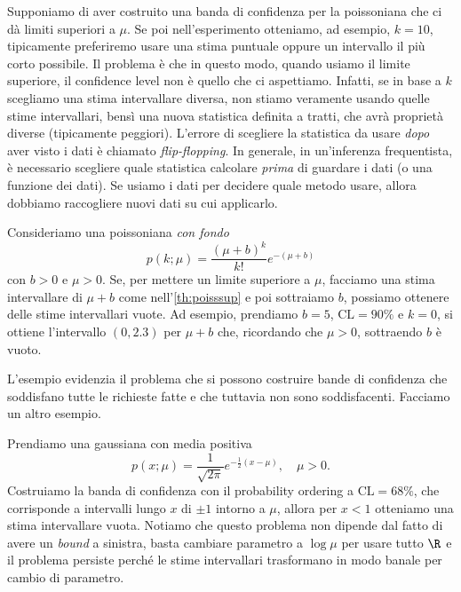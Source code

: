 
Supponiamo di aver costruito una banda di confidenza per la poissoniana che ci dà limiti superiori a $\mu$.
Se poi nell'esperimento otteniamo, ad esempio, $k=10$,
tipicamente preferiremo usare una stima puntuale oppure un intervallo il più corto possibile.
Il problema è che in questo modo, quando usiamo il limite superiore,
il confidence level non è quello che ci aspettiamo.
Infatti, se in base a $k$ scegliamo una stima intervallare diversa,
non stiamo veramente usando quelle stime intervallari,
bensì una nuova statistica definita a tratti,
che avrà proprietà diverse (tipicamente peggiori).
L'errore di scegliere la statistica da usare \emph{dopo}
aver visto i dati è chiamato \emph{flip-flopping}.
In generale, in un'inferenza frequentista,
è necessario scegliere quale statistica calcolare \emph{prima}
di guardare i dati (o una funzione dei dati).
Se usiamo i dati per decidere quale metodo usare,
allora dobbiamo raccogliere nuovi dati su cui applicarlo.

\begin{example}
	Consideriamo una poissoniana \emph{con fondo}
	\begin{equation*}
		p(k;\mu)
		= \frac{(\mu+b)^k}{k!}e^{-(\mu+b)}
	\end{equation*}
	con $b>0$ e $\mu>0$.
	Se, per mettere un limite superiore a $\mu$,
	facciamo una stima intervallare di $\mu+b$ come nell'\autoref{th:poisssup} e poi sottraiamo $b$,
	possiamo ottenere delle stime intervallari vuote.
	Ad esempio, prendiamo $b=5$, $\mathrm{CL}=\SI{90}\%$ e $k=0$,
	si ottiene l'intervallo $(0,2.3)$ per $\mu+b$ che,
	ricordando che $\mu>0$, sottraendo $b$ è vuoto.
\end{example}

L'esempio evidenzia il problema che si possono costruire bande di confidenza
che soddisfano tutte le richieste fatte e che tuttavia non sono soddisfacenti.
Facciamo un altro esempio.

\begin{example}
	Prendiamo una gaussiana con media positiva
	\begin{equation*}
		p(x;\mu)
		= \frac1{\sqrt{2\pi}} e^{-\frac12(x-\mu)}, \quad \mu>0.
	\end{equation*}
	Costruiamo la banda di confidenza con il probability ordering a $\mathrm{CL}=\SI{68}\%$,
	che corrisponde a intervalli lungo $x$ di $\pm1$ intorno a $\mu$,
	allora per $x<1$ otteniamo una stima intervallare vuota.
	Notiamo che questo problema non dipende dal fatto di avere un \emph{bound} a sinistra,
	basta cambiare parametro a $\log\mu$ per usare tutto $\R$ e il problema persiste perché
	le stime intervallari trasformano in modo banale per cambio di parametro.
\end{example}

